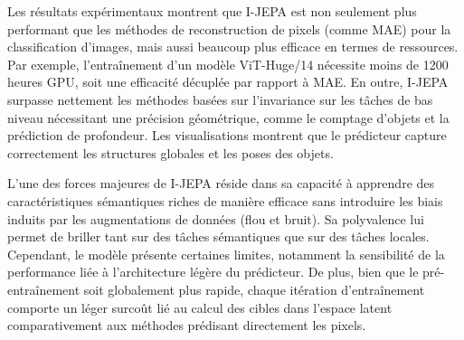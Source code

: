 \documentclass[12pt, a4paper]{article}
\begin{document}
Les résultats expérimentaux montrent que I-JEPA est non seulement plus performant que les méthodes de reconstruction de pixels (comme MAE) pour la classification d'images, mais aussi beaucoup plus efficace en termes de ressources. Par exemple, l'entraînement d'un modèle ViT-Huge/14 nécessite moins de 1200 heures GPU, soit une efficacité décuplée par rapport à MAE. En outre, I-JEPA surpasse nettement les méthodes basées sur l'invariance sur les tâches de bas niveau nécessitant une précision géométrique, comme le comptage d'objets et la prédiction de profondeur. Les visualisations montrent que le prédicteur capture correctement les structures globales et les poses des objets.

L'une des forces majeures de I-JEPA réside dans sa capacité à apprendre des caractéristiques sémantiques riches de manière efficace sans introduire les biais induits par les augmentations de données (flou et bruit). Sa polyvalence lui permet de briller tant sur des tâches sémantiques que sur des tâches locales. Cependant, le modèle présente certaines limites, notamment la sensibilité de la performance liée à l'architecture légère du prédicteur. De plus, bien que le pré-entraînement soit globalement plus rapide, chaque itération d'entraînement comporte un léger surcoût lié au calcul des cibles dans l'espace latent comparativement aux méthodes prédisant directement les pixels.


\newpage


\end{document}
